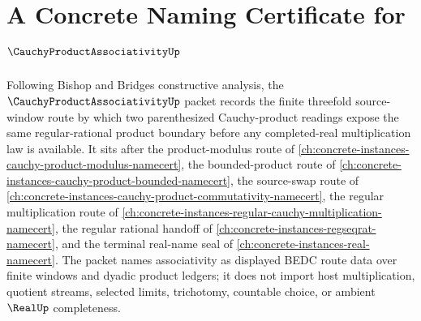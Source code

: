 \chapter{A Concrete Naming Certificate for $\CauchyProductAssociativityUp$}
\label{ch:concrete-instances-cauchy-product-associativity-namecert}

Following Bishop and Bridges constructive analysis, the $\CauchyProductAssociativityUp$ packet records the finite threefold source-window route by which two parenthesized Cauchy-product readings expose the same regular-rational product boundary before any completed-real multiplication law is available. It sits after the product-modulus route of \autoref{ch:concrete-instances-cauchy-product-modulus-namecert}, the bounded-product route of \autoref{ch:concrete-instances-cauchy-product-bounded-namecert}, the source-swap route of \autoref{ch:concrete-instances-cauchy-product-commutativity-namecert}, the regular multiplication route of \autoref{ch:concrete-instances-regular-cauchy-multiplication-namecert}, the regular rational handoff of \autoref{ch:concrete-instances-regseqrat-namecert}, and the terminal real-name seal of \autoref{ch:concrete-instances-real-namecert}. The packet names associativity as displayed BEDC route data over finite windows and dyadic product ledgers; it does not import host multiplication, quotient streams, selected limits, trichotomy, countable choice, or ambient $\RealUp$ completeness.


